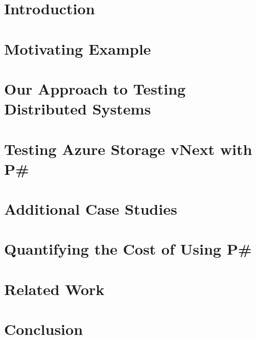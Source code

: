 \documentclass[letterpaper,twocolumn,10pt]{article}
\newcommand{\psharp}{P\#\xspace}
\begin{document}
\section{Introduction}
\label{sec:intro}



\section{Motivating Example}
\label{sec:motivation}



\section{Our Approach to Testing Distributed Systems}
\label{sec:overview}



\section{Testing Azure Storage vNext with \psharp}
\label{sec:method}



\section{Additional Case Studies}
\label{sec:cases}



\section{Quantifying the Cost of Using \psharp}
\label{sec:eval}



\section{Related Work}
\label{sec:rw}



\section{Conclusion}
\label{sec:conclusion}





\balance

{\footnotesize 
}
\end{document}

